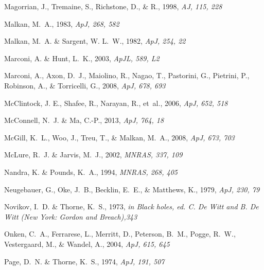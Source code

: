 \documentclass{aa}
\begin{document}
\begin{thebibliography}{}
Magorrian, J., Tremaine, S., Richstone, D., \& R., 1998,
\newblock \emph{AJ, 115, 228}

Malkan, M.~A., 1983,
\newblock \emph{ApJ, 268, 582}

Malkan, M.~A. \& Sargent, W. L.~W., 1982,
\newblock \emph{ApJ, 254, 22}

Marconi, A. \& Hunt, L.~K., 2003,
\newblock \emph{ApJL, 589, L2}

Marconi, A., Axon, D.~J., Maiolino, R., Nagao, T., Pastorini, G., Pietrini, P.,
  Robinson, A., \& Torricelli, G., 2008,
\newblock \emph{ApJ, 678, 693}

McClintock, J. E., Shafee, R., Narayan, R., et~al., 2006,
\newblock \emph{ApJ, 652, 518}

McConnell, N.~J. \& Ma, C.-P., 2013,
\newblock \emph{ApJ, 764, 18}

McGill, K.~L., Woo, J., Treu, T., \& Malkan, M.~A., 2008,
\newblock \emph{ApJ, 673, 703}

McLure, R.~J. \& Jarvis, M.~J., 2002,
\newblock \emph{MNRAS, 337, 109}

Nandra, K. \& Pounds, K.~A., 1994,
\newblock \emph{MNRAS, 268, 405}

Neugebauer, G., Oke, J.~B., Becklin, E.~E., \& Matthews, K., 1979,
\newblock \emph{ApJ, 230, 79}

Novikov, I.~D. \& Thorne, K.~S., 1973,
\newblock \emph{in Black holes, ed. C. De Witt and B. De Witt (New York: Gordon
  and Breach),343}

Onken, C.~A., Ferrarese, L., Merritt, D., Peterson, B.~M., Pogge, R.~W.,
  Vestergaard, M., \& Wandel, A., 2004,
\newblock \emph{ApJ, 615, 645}

Page, D.~N. \& Thorne, K.~S., 1974,
\newblock \emph{ApJ, 191, 507}


\end{thebibliography}
\end{document}
